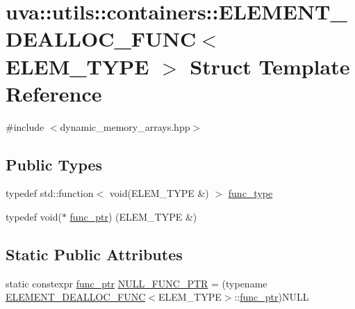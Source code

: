 \hypertarget{structuva_1_1utils_1_1containers_1_1_e_l_e_m_e_n_t___d_e_a_l_l_o_c___f_u_n_c}{}\section{uva\+:\+:utils\+:\+:containers\+:\+:E\+L\+E\+M\+E\+N\+T\+\_\+\+D\+E\+A\+L\+L\+O\+C\+\_\+\+F\+U\+N\+C$<$ E\+L\+E\+M\+\_\+\+T\+Y\+P\+E $>$ Struct Template Reference}
\label{structuva_1_1utils_1_1containers_1_1_e_l_e_m_e_n_t___d_e_a_l_l_o_c___f_u_n_c}


{\ttfamily \#include $<$dynamic\+\_\+memory\+\_\+arrays.\+hpp$>$}

\subsection*{Public Types}
\begin{DoxyCompactItemize}
\item 
typedef std\+::function$<$ void(E\+L\+E\+M\+\_\+\+T\+Y\+P\+E \&) $>$ \hyperlink{structuva_1_1utils_1_1containers_1_1_e_l_e_m_e_n_t___d_e_a_l_l_o_c___f_u_n_c_afb6d875c179834ef4e8deca9fff30090}{func\+\_\+type}
\item 
typedef void($\ast$ \hyperlink{structuva_1_1utils_1_1containers_1_1_e_l_e_m_e_n_t___d_e_a_l_l_o_c___f_u_n_c_a704dc33612334331159eaef71d27309a}{func\+\_\+ptr}) (E\+L\+E\+M\+\_\+\+T\+Y\+P\+E \&)
\end{DoxyCompactItemize}
\subsection*{Static Public Attributes}
\begin{DoxyCompactItemize}
\item 
static constexpr \hyperlink{structuva_1_1utils_1_1containers_1_1_e_l_e_m_e_n_t___d_e_a_l_l_o_c___f_u_n_c_a704dc33612334331159eaef71d27309a}{func\+\_\+ptr} \hyperlink{structuva_1_1utils_1_1containers_1_1_e_l_e_m_e_n_t___d_e_a_l_l_o_c___f_u_n_c_aa48b076559717c3aedd65ddc46bd3702}{N\+U\+L\+L\+\_\+\+F\+U\+N\+C\+\_\+\+P\+T\+R} = (typename \hyperlink{structuva_1_1utils_1_1containers_1_1_e_l_e_m_e_n_t___d_e_a_l_l_o_c___f_u_n_c}{E\+L\+E\+M\+E\+N\+T\+\_\+\+D\+E\+A\+L\+L\+O\+C\+\_\+\+F\+U\+N\+C}$<$E\+L\+E\+M\+\_\+\+T\+Y\+P\+E$>$\+::\hyperlink{structuva_1_1utils_1_1containers_1_1_e_l_e_m_e_n_t___d_e_a_l_l_o_c___f_u_n_c_a704dc33612334331159eaef71d27309a}{func\+\_\+ptr})N\+U\+L\+L
\end{DoxyCompactItemize}


